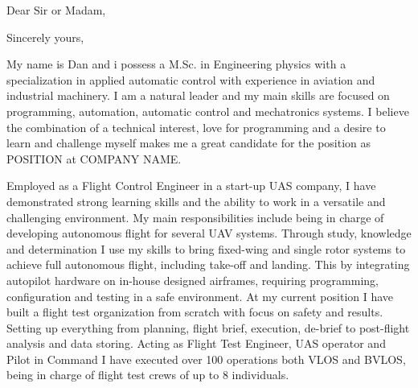 \documentclass[12pt,a4paper,sans]{moderncv} %
\begin{document}
%
%



\clearpage

\date{\today} %
\opening{Dear Sir or Madam,} %
\closing{Sincerely yours,} %

\makelettertitle %

My name is Dan and i possess a M.Sc. in Engineering physics with a specialization in applied automatic control with experience in aviation and industrial machinery.
I am a natural leader and my main skills are focused on programming, automation, automatic control and mechatronics systems.
I believe the combination of a technical interest, love for programming and a desire to learn and challenge myself makes me a great candidate for the position as POSITION at COMPANY NAME.


Employed as a Flight Control Engineer in a start-up UAS company, I have demonstrated strong learning skills and the ability to work in a versatile and challenging environment. 
My main responsibilities include being in charge of developing autonomous flight for several UAV systems. 
Through study, knowledge and determination I use my skills to bring fixed-wing and single rotor systems to achieve full autonomous flight, including take-off and landing. 
This by integrating autopilot hardware on in-house designed airframes, requiring programming, configuration and testing in a safe environment.
\newline
At my current position I have built a flight test organization from scratch with focus on safety and results. 
Setting up everything from planning, flight brief, execution, de-brief to post-flight analysis and data storing. Acting as Flight Test Engineer, UAS operator and Pilot in Command I have executed over 100 operations both VLOS and BVLOS, being in charge of flight test crews of up to 8 individuals.
\end{document}
